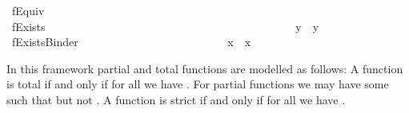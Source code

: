 \begin{isabellebody}
\isamarkupfalse%
\ fEquiv\ {\isacharparenleft}\ {\isachardoublequoteopen}\isactrlbold {\isasymleftrightarrow}{\isachardoublequoteclose}\ {}{}{\isacharparenright}\ \ \ \ \ \ \ \ \ \ \ \ \ \ \ \ \ \ \ \ \ \ \ \ \ \ \ \ \ \isanewline
\ \ {\isachardoublequoteopen}{\isasymphi}\ \isactrlbold {\isasymleftrightarrow}\ {\isasympsi}\ {\isasymequiv}\ {\isacharparenleft}{\isasymphi}\ \isactrlbold {\isasymrightarrow}\ {\isasympsi}{\isacharparenright}\ \isactrlbold {\isasymand}\ {\isacharparenleft}{\isasympsi}\ \isactrlbold {\isasymrightarrow}\ {\isasymphi}{\isacharparenright}{\isachardoublequoteclose}\ \ \isanewline
{}\isamarkupfalse%
\ fExists\ {\isacharparenleft}{\isachardoublequoteopen}\isactrlbold {\isasymexists}{\isachardoublequoteclose}{\isacharparenright}\ \ \ \ \ \ \ \ \ \ \ \ \ \ \ \ \ \ \ \ \ \ \ \ \ \ \ \ \ \ \ \ \ \ \ \ \ \ \ \isanewline
\ \ {\isachardoublequoteopen}\isactrlbold {\isasymexists}{\isasymPhi}\ {\isasymequiv}\ \isactrlbold {\isasymnot}{\isacharparenleft}\isactrlbold {\isasymforall}{\isacharparenleft}{\isasymlambda}y{\isachardot}\ \isactrlbold {\isasymnot}{\isacharparenleft}{\isasymPhi}\ y{\isacharparenright}{\isacharparenright}{\isacharparenright}{\isachardoublequoteclose}\isanewline
{}\isamarkupfalse%
\ fExistsBinder\ {\isacharparenleft}\ {\isachardoublequoteopen}\isactrlbold {\isasymexists}{\isachardoublequoteclose}\ {\isacharbrackleft}{}{\isacharbrackright}{}{\isacharparenright}\ \ \ \ \ \ \ \ \ \ \ \ \ \ \ \ \ \ \ \ \ \isanewline
\ \ {\isachardoublequoteopen}\isactrlbold {\isasymexists}x{\isachardot}\ {\isasymphi}\ x\ {\isasymequiv}\ \isactrlbold {\isasymexists}{\isasymphi}{\isachardoublequoteclose}%
\begin{isamarkuptext}%
In this framework partial and total functions are modelled as follows: 
A function  is total if and only if for all  we have . 
For partial functions  we may have some  such that  but not
 . A function  is strict  if  and only if for all  
we have .%
\end{isamarkuptext}\isamarkuptrue%
%
\isamarkuptrue%
%
\begin{isamarkuptext}%

\end{isamarkuptext}
\end{isabellebody}
